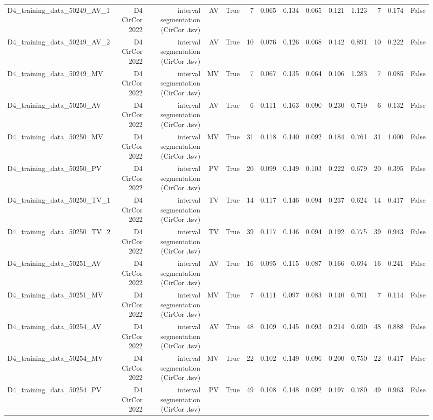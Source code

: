 \begin{table}[htbp]
\begin{tabular}{lrrrrrrrrrrrrr}
    D4\_training\_data\_50249\_AV\_1 & D4 CirCor 2022 & interval segmentation (CirCor .tsv) & AV & True & 7 & 0.065 & 0.134 & 0.065 & 0.121 & 1.123 & 7 & 0.174 & False \\
    D4\_training\_data\_50249\_AV\_2 & D4 CirCor 2022 & interval segmentation (CirCor .tsv) & AV & True & 10 & 0.076 & 0.126 & 0.068 & 0.142 & 0.891 & 10 & 0.222 & False \\
    D4\_training\_data\_50249\_MV & D4 CirCor 2022 & interval segmentation (CirCor .tsv) & MV & True & 7 & 0.067 & 0.135 & 0.064 & 0.106 & 1.283 & 7 & 0.085 & False \\
    D4\_training\_data\_50250\_AV & D4 CirCor 2022 & interval segmentation (CirCor .tsv) & AV & True & 6 & 0.111 & 0.163 & 0.090 & 0.230 & 0.719 & 6 & 0.132 & False \\
    D4\_training\_data\_50250\_MV & D4 CirCor 2022 & interval segmentation (CirCor .tsv) & MV & True & 31 & 0.118 & 0.140 & 0.092 & 0.184 & 0.761 & 31 & 1.000 & False \\
    D4\_training\_data\_50250\_PV & D4 CirCor 2022 & interval segmentation (CirCor .tsv) & PV & True & 20 & 0.099 & 0.149 & 0.103 & 0.222 & 0.679 & 20 & 0.395 & False \\
    D4\_training\_data\_50250\_TV\_1 & D4 CirCor 2022 & interval segmentation (CirCor .tsv) & TV & True & 14 & 0.117 & 0.146 & 0.094 & 0.237 & 0.624 & 14 & 0.417 & False \\
    D4\_training\_data\_50250\_TV\_2 & D4 CirCor 2022 & interval segmentation (CirCor .tsv) & TV & True & 39 & 0.117 & 0.146 & 0.094 & 0.192 & 0.775 & 39 & 0.943 & False \\
    D4\_training\_data\_50251\_AV & D4 CirCor 2022 & interval segmentation (CirCor .tsv) & AV & True & 16 & 0.095 & 0.115 & 0.087 & 0.166 & 0.694 & 16 & 0.241 & False \\
    D4\_training\_data\_50251\_MV & D4 CirCor 2022 & interval segmentation (CirCor .tsv) & MV & True & 7 & 0.111 & 0.097 & 0.083 & 0.140 & 0.701 & 7 & 0.114 & False \\
    D4\_training\_data\_50254\_AV & D4 CirCor 2022 & interval segmentation (CirCor .tsv) & AV & True & 48 & 0.109 & 0.145 & 0.093 & 0.214 & 0.690 & 48 & 0.888 & False \\
    D4\_training\_data\_50254\_MV & D4 CirCor 2022 & interval segmentation (CirCor .tsv) & MV & True & 22 & 0.102 & 0.149 & 0.096 & 0.200 & 0.750 & 22 & 0.417 & False \\
    D4\_training\_data\_50254\_PV & D4 CirCor 2022 & interval segmentation (CirCor .tsv) & PV & True & 49 & 0.108 & 0.148 & 0.092 & 0.197 & 0.780 & 49 & 0.963 & False \\

\end{tabular}
\end{table}
